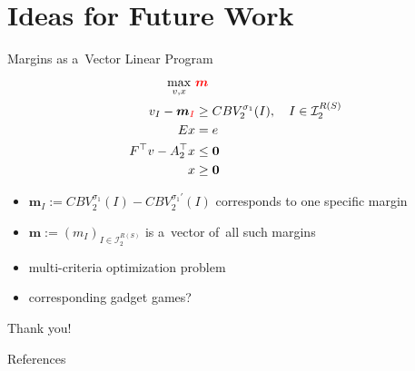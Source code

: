 \documentclass{beamer}
\theoremstyle{definition}
\newcommand{\vect}[1]{\boldsymbol{#1}}
\newcommand{\I}{\mathcal{I}}
\begin{document}
  \section{Ideas for Future Work}

  \begin{frame}{Margins as a~Vector Linear Program}
    \begin{equation*}
      \label{vlp:max-margins}
      \begin{split}
        \max_{v, x}\ &\textcolor{red}{\vect{m}} \\
        v_I - \vect{m}_{\textcolor{red}{I}} &\ge CBV_2^{\sigma_1}(I), \quad I \in \I_2^{R(S)}\\ 
        Ex &= e \\
        F^\top v - A_2^\top x &\le \vect{0} \\
        x &\ge \vect{0}
      \end{split}
    \end{equation*}

    \pause
    \begin{itemize}[<+- | alert@+>]
      \item $\vect{m}_I := CBV_2^{\sigma_1} (I) - CBV_2^{\sigma_1'} (I)$ corresponds to one specific margin
      \item $\vect{m} := (m_I) _{I\in\I_2^{R(S)}}$ is a~vector of~all such margins
      \item multi-criteria optimization problem
      \item corresponding gadget games?
    \end{itemize}
  \end{frame}

  \begin{frame}[standout]
    \begin{center}
      Thank you!
    \end{center}
  \end{frame}

  \begin{frame}[allowframebreaks]{References}
    \tiny
    \printbibliography[heading=none]
  \end{frame}
\end{document}
